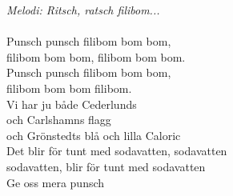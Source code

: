 {\footnotesize\textit{Melodi: Ritsch, ratsch filibom...}}\\
\\
Punsch punsch filibom bom bom,\\
filibom bom bom, filibom bom bom. \\
Punsch punsch filibom bom bom,\\
filibom bom bom filibom.\\
Vi har ju både Cederlunds \\
och Carlshamns flagg\\
och Grönstedts blå och lilla Caloric\\
Det blir för tunt med sodavatten, sodavatten\\
sodavatten, blir för tunt med sodavatten\\
Ge oss mera punsch
